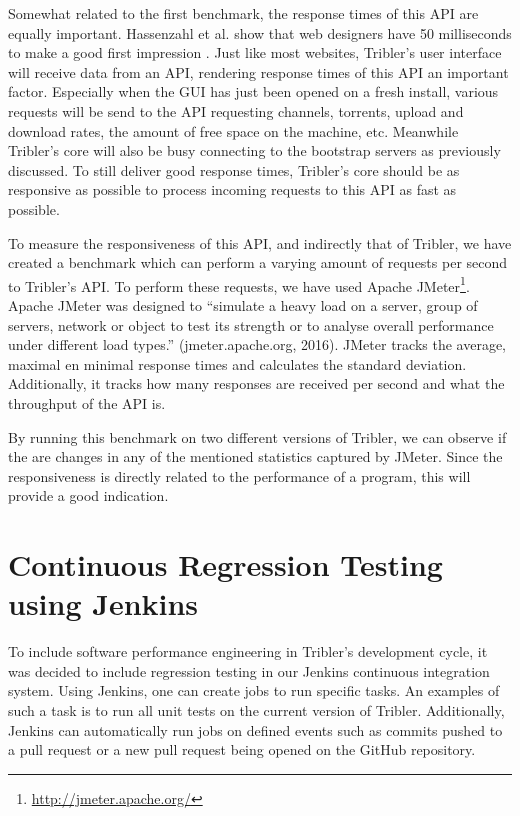 Somewhat related to the first benchmark, the response times of this API are equally important.
Hassenzahl et al. show that web designers have 50 milliseconds to make a good first impression \cite{lindgaard2006attention}.
Just like most websites, Tribler's user interface will receive data from an API, rendering response times of this API an important factor.
Especially when the GUI has just been opened on a fresh install, various requests will be send to the API requesting channels, torrents, upload and download rates, the amount of free space on the machine, etc.
Meanwhile Tribler's core will also be busy connecting to the bootstrap servers as previously discussed.
To still deliver good response times, Tribler's core should be as responsive as possible to process incoming requests to this API as fast as possible.

To measure the responsiveness of this API, and indirectly that of Tribler, we have created a benchmark which can perform a varying amount of requests per second to Tribler's API.
To perform these requests, we have used Apache JMeter\footnote{\url{http://jmeter.apache.org/}}.
Apache JMeter was designed to \enquote{simulate a heavy load on a server, group of servers, network or object to test its strength or to analyse overall performance under different load types.} (jmeter.apache.org, 2016).
JMeter tracks the average, maximal en minimal response times and calculates the standard deviation.
Additionally, it tracks how many responses are received per second and what the throughput of the API is.

By running this benchmark on two different versions of Tribler, we can observe if the are changes in any of the mentioned statistics captured by JMeter.
Since the responsiveness is directly related to the performance of a program, this will provide a good indication.


\section{Continuous Regression Testing using Jenkins}

To include software performance engineering in Tribler's development cycle, it was decided to include regression testing in our Jenkins continuous integration system.
Using Jenkins, one can create jobs to run specific tasks.
An examples of such a task is to run all unit tests on the current version of Tribler.
Additionally, Jenkins can automatically run jobs on defined events such as commits pushed to a pull request or a new pull request being opened on the GitHub repository.


